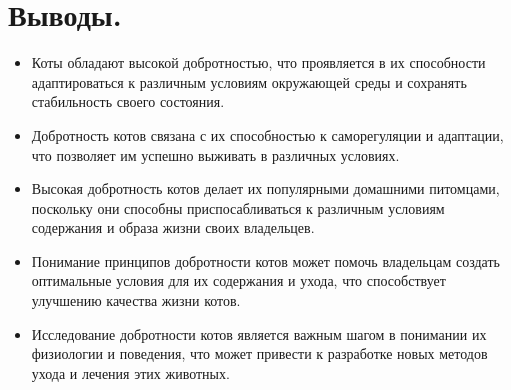 \documentclass[12pt,a4paper]{article}
\begin{document}
\section{Выводы.}
\begin{itemize}
    \item Коты обладают высокой добротностью, что проявляется в их способности адаптироваться к различным условиям окружающей среды и сохранять стабильность своего состояния.
    \item Добротность котов связана с их способностью к саморегуляции и адаптации, что позволяет им успешно выживать в различных условиях.
    \item Высокая добротность котов делает их популярными домашними питомцами, поскольку они способны приспосабливаться к различным условиям содержания и образа жизни своих владельцев.
    \item Понимание принципов добротности котов может помочь владельцам создать оптимальные условия для их содержания и ухода, что способствует улучшению качества жизни котов.
    \item Исследование добротности котов является важным шагом в понимании их физиологии и поведения, что может привести к разработке новых методов ухода и лечения этих животных.
\end{itemize}
\end{document}
